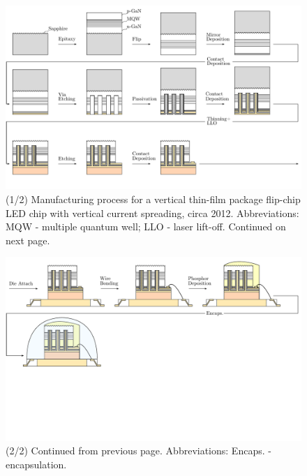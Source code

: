 \documentclass[10pt]{article}
\begin{document}

    \begin{landscape}
        \begin{figure}
            \includegraphics[width=595pt]{./figures/vtf_overview_2012-1.pdf}
            \caption{(1/2) Manufacturing process for a vertical thin-film  package flip-chip LED chip with vertical current spreading, circa 2012. Abbreviations: MQW - multiple quantum well; LLO - laser lift-off. Continued on next page.}
            \label{fig:manuf_vtf_2012-1}
        \end{figure}
    \end{landscape}

    \begin{landscape}
        \begin{figure}
            \includegraphics[width=595pt]{./figures/vtf_overview_2012-2.pdf}
            \caption{(2/2) Continued from previous page. Abbreviations: Encaps. - encapsulation.}
            \label{fig:manuf_vtf_2012-2}
        \end{figure}
    \end{landscape}
\end{document}
